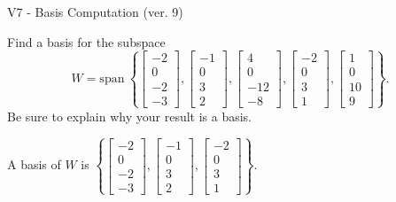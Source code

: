 \begin{exercise}
  \begin{exerciseTitle}V7 - Basis Computation (ver. 9)\end{exerciseTitle}
  \begin{exerciseStatement}
    Find a basis for the subspace 
\[W=\mathrm{span}\ \left\{\left[\begin{array}{r}
-2 \\
0 \\
-2 \\
-3
\end{array}\right] , \left[\begin{array}{r}
-1 \\
0 \\
3 \\
2
\end{array}\right] , \left[\begin{array}{r}
4 \\
0 \\
-12 \\
-8
\end{array}\right] , \left[\begin{array}{r}
-2 \\
0 \\
3 \\
1
\end{array}\right] , \left[\begin{array}{r}
1 \\
0 \\
10 \\
9
\end{array}\right]\right\}.\]
 Be sure to explain why your result is a basis.


  \end{exerciseStatement}
  \begin{exerciseAnswer}
   A basis of \(W\) is  \(\left\{\left[\begin{array}{r}
-2 \\
0 \\
-2 \\
-3
\end{array}\right] , \left[\begin{array}{r}
-1 \\
0 \\
3 \\
2
\end{array}\right] , \left[\begin{array}{r}
-2 \\
0 \\
3 \\
1
\end{array}\right]\right\}\).
  


  \end{exerciseAnswer}
\end{exercise}